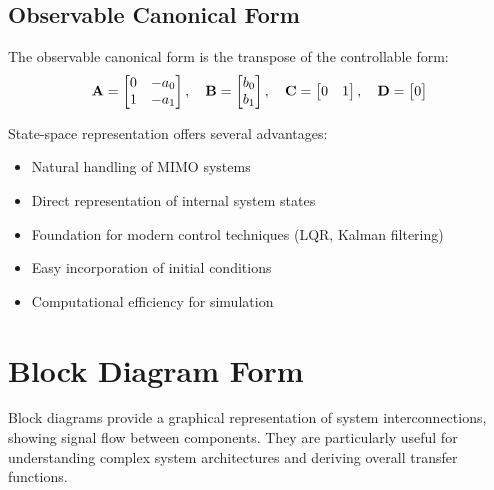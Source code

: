 \subsection{Observable Canonical Form}

The observable canonical form is the transpose of the controllable form:
\begin{equation}
\mathbf{A} = \begin{bmatrix} 0 & -a_0 \\ 1 & -a_1 \end{bmatrix}, \quad
\mathbf{B} = \begin{bmatrix} b_0 \\ b_1 \end{bmatrix}, \quad
\mathbf{C} = \begin{bmatrix} 0 & 1 \end{bmatrix}, \quad
\mathbf{D} = \begin{bmatrix} 0 \end{bmatrix}
\label{eq:ocf}
\end{equation}

\begin{keyconceptbox}[title=State-Space Advantages]
State-space representation offers several advantages:
\begin{itemize}
    \item Natural handling of MIMO systems
    \item Direct representation of internal system states
    \item Foundation for modern control techniques (LQR, Kalman filtering)
    \item Easy incorporation of initial conditions
    \item Computational efficiency for simulation
\end{itemize}
\end{keyconceptbox}

\section{Block Diagram Form}
\label{sec:block_diagram_form}

Block diagrams provide a graphical representation of system interconnections, showing signal flow between components. They are particularly useful for understanding complex system architectures and deriving overall transfer functions.

